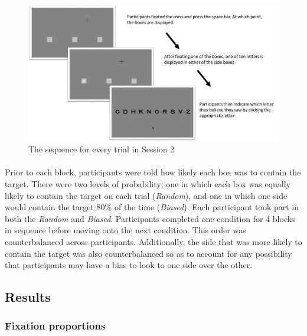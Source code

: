 \documentclass[12pt]{article}
\begin{document}
\begin{figure}[ht!]
	\includegraphics[scale=0.35]{Figures/Experiment_4_prob/Part2_Trial}
	\centering
	\captionsetup{justification=centering}
	\caption{The sequence for every trial in Session 2}
	\label{fig:Session2-Prob}
\end{figure}

\paragraph{} Prior to each block, participants were told how likely each box was to contain the target. There were two levels of probability; one in which each box was equally likely to contain the target on each trial (\textit{Random}), and one in which one side would contain the target $80\%$ of the time (\textit{Biased}). Each participant took part in both the \textit{Random} and \textit{Biased}. Participants completed one condition for 4 blocks in sequence before moving onto the next condition. This order was counterbalanced across participants. Additionally, the side that was more likely to contain the target was also counterbalanced so as to account for any possibility that participants may have a bias to look to one side over the other. 

\subsection*{Results}
\subsubsection*{Fixation proportions}
\end{document}

